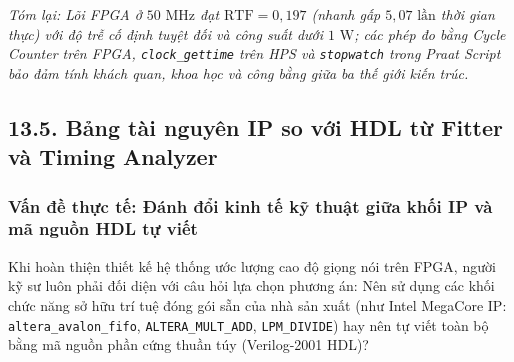 \textit{Tóm lại: Lõi FPGA ở $50\text{ MHz}$ đạt $\text{RTF} = 0{,}197$ (nhanh gấp $5{,}07\text{ lần}$ thời gian thực) với độ trễ cố định tuyệt đối và công suất dưới $1\text{ W}$; các phép đo bằng Cycle Counter trên FPGA, \texttt{clock\_gettime} trên HPS và \texttt{stopwatch} trong Praat Script bảo đảm tính khách quan, khoa học và công bằng giữa ba thế giới kiến trúc.}

\subsection*{13.5. Bảng tài nguyên IP so với HDL từ Fitter và Timing Analyzer}

\subsubsection*{Vấn đề thực tế: Đánh đổi kinh tế kỹ thuật giữa khối IP và mã nguồn HDL tự viết}
Khi hoàn thiện thiết kế hệ thống ước lượng cao độ giọng nói trên FPGA, người kỹ sư luôn phải đối diện với câu hỏi lựa chọn phương án: Nên sử dụng các khối chức năng sở hữu trí tuệ đóng gói sẵn của nhà sản xuất (như Intel MegaCore IP: \texttt{altera\_avalon\_fifo}, \texttt{ALTERA\_MULT\_ADD}, \texttt{LPM\_DIVIDE}) hay nên tự viết toàn bộ bằng mã nguồn phần cứng thuần túy (Verilog-2001 HDL)?

